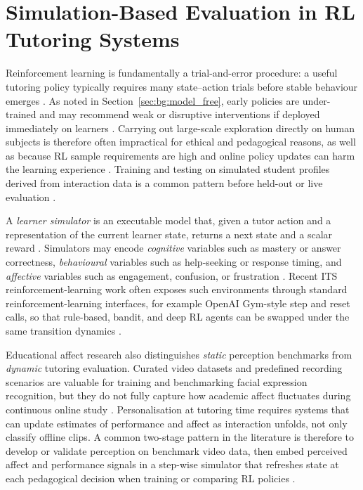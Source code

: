 \section{Simulation-Based Evaluation in RL Tutoring Systems}\label{sec:bg:simulation}

Reinforcement learning is fundamentally a trial-and-error procedure: a useful tutoring policy typically requires many state–action trials before stable behaviour emerges \cite{sutton_rl_book_2018}. As noted in Section~\ref{sec:bg:model_free}, early policies are under-trained and may recommend weak or disruptive interventions if deployed immediately on learners \cite{sutton_rl_book_2018}. Carrying out large-scale exploration directly on human subjects is therefore often impractical for ethical and pedagogical reasons, as well as because RL sample requirements are high and online policy updates can harm the learning experience \cite{azoulay_adaptive_2021,axak_adaptive_nodate}. Training and testing on simulated student profiles derived from interaction data is a common pattern before held-out or live evaluation \cite{azoulay_adaptive_2021,deshmukh_developing_2025,weitekamp_tutorgym_2025}.

A \emph{learner simulator} is an executable model that, given a tutor action and a representation of the current learner state, returns a next state and a scalar reward \cite{azoulay_adaptive_2021,weitekamp_tutorgym_2025,axak_adaptive_nodate}. Simulators may encode \emph{cognitive} variables such as mastery or answer correctness, \emph{behavioural} variables such as help-seeking or response timing, and \emph{affective} variables such as engagement, confusion, or frustration \cite{axak_adaptive_nodate,perez_emotions_2024}. Recent ITS reinforcement-learning work often exposes such environments through standard reinforcement-learning interfaces, for example OpenAI Gym-style step and reset calls, so that rule-based, bandit, and deep RL agents can be swapped under the same transition dynamics \cite{weitekamp_tutorgym_2025,axak_adaptive_nodate}.

Educational affect research also distinguishes \emph{static} perception benchmarks from \emph{dynamic} tutoring evaluation. Curated video datasets and predefined recording scenarios are valuable for training and benchmarking facial expression recognition, but they do not fully capture how academic affect fluctuates during continuous online study \cite{gupta_daisee_2016,lek_academic_2023}. Personalisation at tutoring time requires systems that can update estimates of performance and affect as interaction unfolds, not only classify offline clips. A common two-stage pattern in the literature is therefore to develop or validate perception on benchmark video data, then embed perceived affect and performance signals in a step-wise simulator that refreshes state at each pedagogical decision when training or comparing RL policies \cite{perez_emotions_2024,gong_design_2025,lek_academic_2023}.

